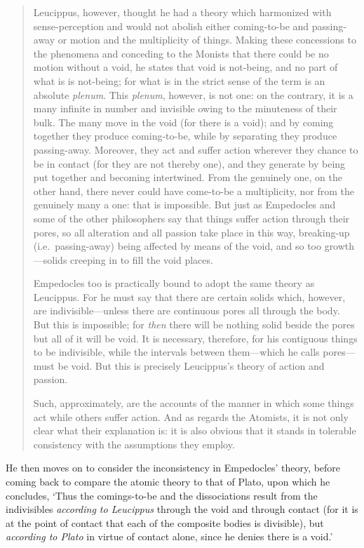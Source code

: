 \begin{quotation}
Leucippus, however, thought he had a theory which harmonized with sense-perception and would not abolish either coming-to-be and passing-away or motion and the multiplicity of things. Making these concessions to the phenomena and conceding to the Monists that there could be no motion without a void, he states that void is not-being, and no part of what is is not-being; for what is in the strict sense of the term is an absolute \textit{plenum}. This \textit{plenum}, however, is not one: on the contrary, it is a many infinite in number and invisible owing to the minuteness of their bulk. The many move in the void (for there is a void); and by coming together they produce coming-to-be, while by separating they produce passing-away. Moreover, they act and suffer action wherever they chance to be in contact (for they are not thereby one), and they generate by being put together and becoming intertwined. From the genuinely one, on the other hand, there never could have come-to-be a multiplicity, nor from the genuinely many a one: that is impossible. But just as Empedocles and some of the other philosophers say that things suffer action through their pores, so all alteration and all passion take place in this way, breaking-up (i.e.~passing-away) being affected by means of the void, and so too growth---solids creeping in to fill the void places.

Empedocles too is practically bound to adopt the same theory as Leucippus. For he must say that there are certain solids which, however, are indivisible---unless there are continuous pores all through the body. But this is impossible; for \textit{then} there will be nothing solid beside the pores but all of it will be void. It is necessary, therefore, for his contiguous things to be indivisible, while the intervals between them---which he calls pores---must be void. But this is precisely Leucippus's theory of action and passion.

Such, approximately, are the accounts of the manner in which some things act while others suffer action. And as regards the Atomists, it is not only clear what their explanation is: it is also obvious that it stands in tolerable consistency with the assumptions they employ.
\end{quotation}
He then moves on to consider the inconsistency in Empedocles' theory, before coming back to compare the atomic theory to that of Plato, upon which he concludes, `Thus the comings-to-be and the dissociations result from the indivisibles \textit{according to Leucippus} through the void and through contact (for it is at the point of contact that each of the composite bodies is divisible), but \textit{according to Plato} in virtue of contact alone, since he denies there is a void.'

